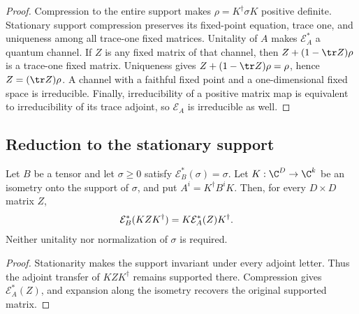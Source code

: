 \begin{proof}\leanok
    Compression to the entire support makes
    $\rho=K^\dagger\sigma K$ positive definite. Stationary support
    compression preserves its fixed-point equation, trace one, and
    uniqueness among all trace-one fixed matrices.
    Unitality of $A$ makes $\mathcal E_A^*$ a quantum channel.
    If $Z$ is any fixed matrix of that channel, then
    $Z+(1-\tr Z)\rho$ is a trace-one fixed matrix. Uniqueness gives
    $Z+(1-\tr Z)\rho=\rho$, hence $Z=(\tr Z)\rho$.
    A channel with a faithful fixed point and a one-dimensional fixed
    space is irreducible. Finally, irreducibility of a positive matrix
    map is equivalent to irreducibility of its trace adjoint, so
    $\mathcal E_A$ is irreducible as well.
\end{proof}

\subsection{Reduction to the stationary support}

\begin{lemma}
    \label{thm:spc_aux_adjoint_support_intertwining}
    \leanok
    Let $B$ be a tensor and let $\sigma\geq0$ satisfy
    $\mathcal E_B^*(\sigma)=\sigma$. Let $K:\C^D\to\C^k$ be an isometry
    onto the support of $\sigma$, and put $A^i=K^\dagger B^iK$.
    Then, for every $D\times D$ matrix $Z$,
    \begin{align}
        \mathcal E_B^*(KZK^\dagger)
         & =K\mathcal E_A^*(Z)K^\dagger.\notag
    \end{align}
    Neither unitality nor normalization of $\sigma$ is required.
\end{lemma}

\begin{proof}\leanok
    Stationarity makes the support invariant under every adjoint letter.
    Thus the adjoint transfer of $KZK^\dagger$ remains supported there.
    Compression gives $\mathcal E_A^*(Z)$, and expansion along the
    isometry recovers the original supported matrix.
\end{proof}

